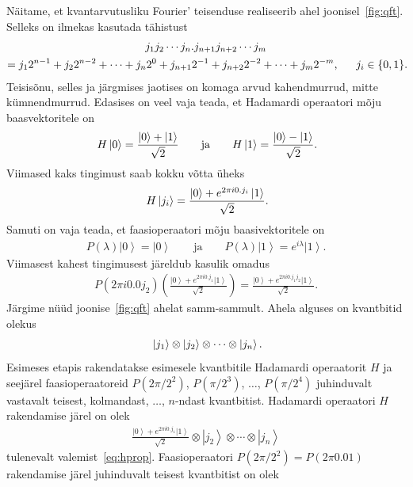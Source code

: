 \documentclass[12pt]{report}
\def\paren#1{\left(#1\right)}
\def\ket#1{\left|#1\right>}
\begin{document}
Näitame, et kvantarvutusliku Fourier' teisenduse realiseerib ahel joonisel~\ref{fig:qft}.
Selleks on ilmekas kasutada tähistust
\begin{multline}
    j_1j_2\cdots j_n.j_{n+1}j_{n+2}\cdots j_m \\
    = j_1 2^{n-1} + j_2 2^{n-2} + \cdots + j_n 2^0 + j_{n+1} 2^{-1} + j_{n+2} 2^{-2} + \cdots + j_m 2^{-m} \rlap{,}
    \qquad j_i \in \{0, 1\} \rlap{.}
\end{multline}
Teisisõnu, selles ja järgmises jaotises on komaga arvud kahendmurrud, mitte kümnendmurrud.
Edasises on veel vaja teada, et Hadamardi operaatori mõju baasvektoritele on
\begin{align}
    H\ket{0} = \frac{\ket{0} + \ket{1}}{\sqrt{2}}
    \qquad\text{ja}\qquad
    H\ket{1} = \frac{\ket{0} - \ket{1}}{\sqrt{2}} \rlap{.}
\end{align}
Viimased kaks tingimust saab kokku võtta üheks
\begin{align}\label{eq:hprop}
    H\ket{j_i} = \frac{\ket{0} + e^{2\pi i0.j_i}\ket{1}}{\sqrt{2}}\rlap{.}
\end{align}
Samuti on vaja teada, et faasioperaatori mõju baasivektoritele on
\begin{align}
    P(\lambda)\ket{0} = \ket{0}
    \qquad\text{ja}\qquad
    P(\lambda)\ket{1} = e^{i\lambda}\ket{1} .
\end{align}
Viimasest kahest tingimusest järeldub kasulik omadus
\begin{align}\label{eq:phaseprop}
    P(2\pi i0.0j_2)\paren{\frac{\ket{0} + e^{2\pi i 0.j_1} \ket{1}}{\sqrt{2}}}
    = \frac{\ket{0}+e^{2\pi i0.j_1j_2}\ket{1}}{\sqrt{2}} .
\end{align}
Järgime nüüd joonise~\ref{fig:qft} ahelat samm-sammult.
Ahela alguses on kvantbitid olekus
\begin{align}
    \ket{j_1} \otimes \ket{j_2} \otimes \cdots \otimes \ket{j_n} \rlap{.}
\end{align}
Esimeses etapis rakendatakse esimesele kvantbitile Hadamardi operaatorit \(H\) ja seejärel faasioperaatoreid \(P(2\pi/2^2)\), \(P(\pi/2^3)\), \(\ldots\), \(P(\pi/2^4)\) juhinduvalt vastavalt teisest, kolmandast, \(\ldots\), \(n\)-ndast kvantbitist.
Hadamardi operaatori \(H\) rakendamise järel on olek
\begin{align}
    \frac{\ket{0} + e^{2\pi i0.j_1}\ket{1}}{\sqrt{2}} \otimes \ket{j_2} \otimes \cdots \otimes \ket{j_n}
\end{align}
tulenevalt valemist~\eqref{eq:hprop}.
Faasioperaatori \(P(2\pi/2^2) = P(2\pi0.01)\) rakendamise järel juhinduvalt teisest kvantbitist on olek
\end{document}
